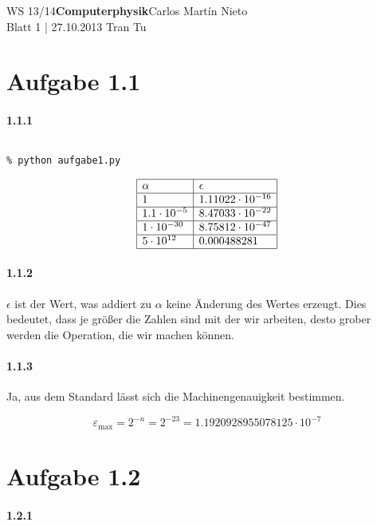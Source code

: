 \documentclass[a4paper,ngerman]{scrartcl}
\begin{document}
\noindent WS 13/14\hfill \textbf{Computerphysik}\hfill Carlos Martín Nieto\\
Blatt 1 | 27.10.2013 \hfill Tran Tu\\

\noindent\hrulefill

\section*{Aufgabe 1.1}

\paragraph{1.1.1}

\inputminted[mathescape,linenos]{python}{aufgabe1.py}

\texttt{\% python aufgabe1.py}

\[
\begin{array}{|l|l|}\hline
  \alpha & \epsilon\\\hline
  1       &1.11022\cdot 10^{-16}\\\hline
  1.1\cdot 10^{-5} &8.47033\cdot 10^{-22}\\\hline
  1\cdot 10^{-30}   &8.75812\cdot 10^{-47}\\\hline
  5\cdot 10^{12}   &0.000488281\\\hline
\end{array}
\]
\paragraph{1.1.2}

$\epsilon$ ist der Wert, was addiert zu $\alpha$ keine Änderung des Wertes erzeugt. Dies bedeutet, dass je größer die Zahlen sind mit der wir arbeiten, desto grober werden die Operation, die wir machen können.

\paragraph{1.1.3}

Ja, aus dem Standard lässt sich die Machinengenauigkeit bestimmen.

\[
\varepsilon_{\text{max}} = 2^{-n} = 2^{-23} = 1.1920928955078125\cdot 10^{-7}
\]

\section*{Aufgabe 1.2}

\paragraph{1.2.1}
\end{document}

